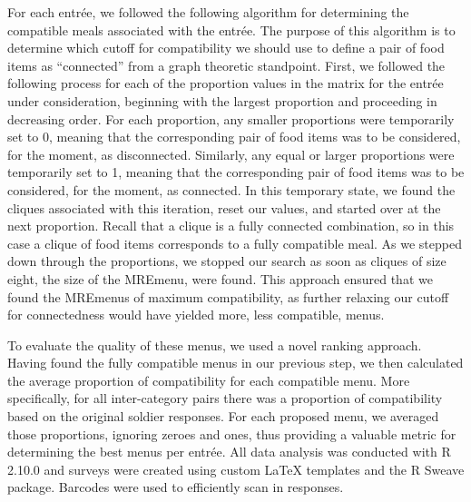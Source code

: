 For each entrée, we followed the following algorithm for determining the compatible meals associated with the entrée.  The purpose of this algorithm is to determine which cutoff for compatibility we should use to define a pair of food items as “connected” from a graph theoretic standpoint.  First, we followed the following process for each of the proportion values in the matrix for the entrée under consideration, beginning with the largest proportion and proceeding in decreasing order.  For each proportion, any smaller proportions were temporarily set to 0, meaning that the corresponding pair of food items was to be considered, for the moment, as disconnected.  Similarly, any equal or larger proportions were temporarily set to 1, meaning that the corresponding pair of food items was to be considered, for the moment, as connected.  In this temporary state, we found the cliques associated with this iteration, reset our values, and started over at the next proportion.  Recall that a clique is a fully connected combination, so in this case a clique of food items corresponds to a fully compatible meal.  As we stepped down through the proportions, we stopped our search as soon as cliques of size eight, the size of the MRE\tm menu, were found.  This approach ensured that we found the MRE\tm menus of maximum compatibility, as further relaxing our cutoff for connectedness would have yielded more, less compatible, menus.  

To evaluate the quality of these menus, we used a novel ranking approach.  Having found the fully compatible menus in our previous step, we then calculated the average proportion of compatibility for each compatible menu.  More specifically, for all inter-category pairs there was a proportion of compatibility based on the original soldier responses.  For each proposed menu, we averaged those proportions, ignoring zeroes and ones, thus providing a valuable metric for determining the best menus per entrée.  All data analysis was conducted with R 2.10.0 and surveys were created using custom LaTeX templates and the R Sweave package.  Barcodes were used to efficiently scan in responses.

